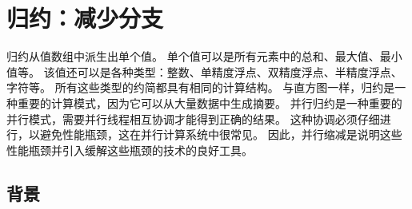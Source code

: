 \section{归约：减少分支}
归约从值数组中派生出单个值。 单个值可以是所有元素中的总和、最大值、最小值等。 该值还可以是各种类型：整数、单精度浮点、双精度浮点、半精度浮点、字符等。 所有这些类型的约简都具有相同的计算结构。 与直方图一样，归约是一种重要的计算模式，因为它可以从大量数据中生成摘要。 并行归约是一种重要的并行模式，需要并行线程相互协调才能得到正确的结果。 这种协调必须仔细进行，以避免性能瓶颈，这在并行计算系统中很常见。 因此，并行缩减是说明这些性能瓶颈并引入缓解这些瓶颈的技术的良好工具。

\subsection{背景}